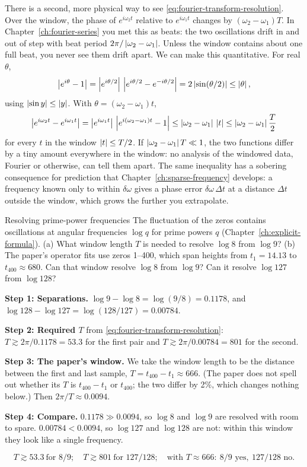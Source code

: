 There is a second, more physical way to see \eqref{eq:fourier-transform-resolution}. Over the window, the phase of $e^{i\omega_2t}$ relative to $e^{i\omega_1t}$ changes by $(\omega_2-\omega_1)T$. In Chapter~\ref{ch:fourier-series} you met this as beats: the two oscillations drift in and out of step with beat period $2\pi/\left\lvert \omega_2-\omega_1\right\rvert$. Unless the window contains about one full beat, you never see them drift apart. We can make this quantitative. For real $\theta$,
\[\left\lvert e^{i\theta}-1\right\rvert=\left\lvert e^{i\theta/2}\right\rvert\,\left\lvert e^{i\theta/2}-e^{-i\theta/2}\right\rvert=2\left\lvert \sin(\theta/2)\right\rvert\le\left\lvert \theta\right\rvert,\]
using $\left\lvert \sin y\right\rvert\le\left\lvert y\right\rvert$. With $\theta=(\omega_2-\omega_1)t$,
\begin{equation}
\left\lvert e^{i\omega_2t}-e^{i\omega_1t}\right\rvert=\left\lvert e^{i\omega_1t}\right\rvert\,\left\lvert e^{i(\omega_2-\omega_1)t}-1\right\rvert\le\left\lvert \omega_2-\omega_1\right\rvert\,\left\lvert t\right\rvert\le\left\lvert \omega_2-\omega_1\right\rvert\frac T2
\label{eq:fourier-transform-indist}
\end{equation}
for every $t$ in the window $\left\lvert t\right\rvert\le T/2$. If $\left\lvert \omega_2-\omega_1\right\rvert T\ll1$, the two functions differ by a tiny amount everywhere in the window: no analysis of the windowed data, Fourier or otherwise, can tell them apart. The same inequality has a sobering consequence for prediction that Chapter~\ref{ch:sparse-frequency} develops: a frequency known only to within $\delta\omega$ gives a phase error $\delta\omega\,\Delta t$ at a distance $\Delta t$ outside the window, which grows the further you extrapolate.

\begin{sample}{Resolving prime-power frequencies}
The fluctuation of the zeros contains oscillations at angular frequencies $\log q$ for prime powers $q$ (Chapter~\ref{ch:explicit-formula}). (a) What window length $T$ is needed to resolve $\log8$ from $\log9$? (b) The paper's operator fits use zeros 1--400, which span heights from $t_1=14.13$ to $t_{400}\approx680$. Can that window resolve $\log 8$ from $\log 9$? Can it resolve $\log127$ from $\log128$?

\textbf{Step 1: Separations.} $\log9-\log8=\log(9/8)=0.1178$, and $\log128-\log127=\log(128/127)=0.00784$.

\textbf{Step 2: Required $T$} from \eqref{eq:fourier-transform-resolution}: $T\gtrsim2\pi/0.1178=53.3$ for the first pair and $T\gtrsim2\pi/0.00784=801$ for the second.

\textbf{Step 3: The paper's window.} We take the window length to be the distance between the first and last sample, $T=t_{400}-t_1\approx666$. (The paper does not spell out whether its $T$ is $t_{400}-t_1$ or $t_{400}$; the two differ by 2\%, which changes nothing below.) Then $2\pi/T\approx0.0094$.

\textbf{Step 4: Compare.} $0.1178\gg0.0094$, so $\log8$ and $\log9$ are resolved with room to spare. $0.00784<0.0094$, so $\log127$ and $\log128$ are not: within this window they look like a single frequency.

\[\boxed{T\gtrsim53.3\ \text{for }8/9;\quad T\gtrsim801\ \text{for }127/128;\quad\text{with }T\approx666:\ 8/9\text{ yes},\ 127/128\text{ no}.}\]
\end{sample}

